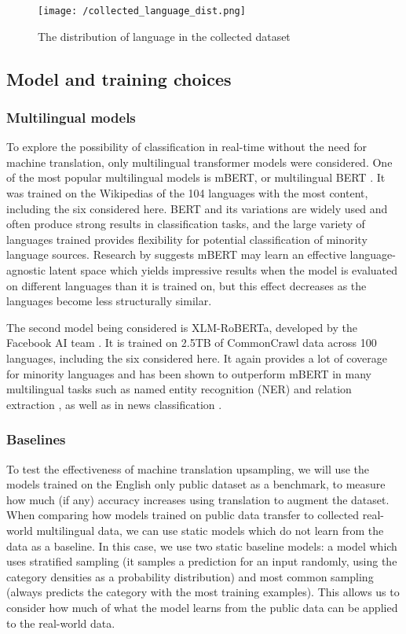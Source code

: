 \documentclass{l4proj}
\begin{document}
\begin{figure}[h]
\texttt{[image: /collected\_language\_dist.png]}
\caption{The distribution of language in the collected dataset}
\label{fig:collected_lang_dist}
\end{figure}

\subsection{Model and training choices}
\subsubsection{Multilingual models} \hfill \par
To explore the possibility of classification in real-time without the need for machine translation, only multilingual transformer models were considered. One of the most popular multilingual models is mBERT, or multilingual BERT \citep{devlin2018bert}. It was trained on the Wikipedias of the 104 languages with the most content, including the six considered here. BERT and its variations are widely used and often produce strong results in classification tasks, and the large variety of languages trained provides flexibility for potential classification of minority language sources. Research by \cite{pires2019multilingual} suggests mBERT may learn an effective language-agnostic latent space which yields impressive results when the model is evaluated on different languages than it is trained on, but this effect decreases as the languages become less structurally similar. \par
The second model being considered is XLM-RoBERTa, developed by the Facebook AI team \citep{conneau2019unsupervised}. It is trained on 2.5TB of CommonCrawl data across 100 languages, including the six considered here. It again provides a lot of coverage for minority languages and has been shown to outperform mBERT in many multilingual tasks such as named entity recognition (NER) and relation extraction \citep{li2021cross, lan2020empirical}, as well as in news classification \citep{alam2020bangla}.

\subsubsection{Baselines} \hfill \par
To test the effectiveness of machine translation upsampling, we will use the models trained on the English only public dataset as a benchmark, to measure how much (if any) accuracy increases using translation to augment the dataset. When comparing how models trained on public data transfer to collected real-world multilingual data, we can use static models which do not learn from the data as a baseline. In this case, we use two static baseline models: a model which uses stratified sampling (it samples a prediction for an input randomly, using the category densities as a probability distribution) and most common sampling (always predicts the category with the most training examples). This allows us to consider how much of what the model learns from the public data can be applied to the real-world data.
\end{document}
